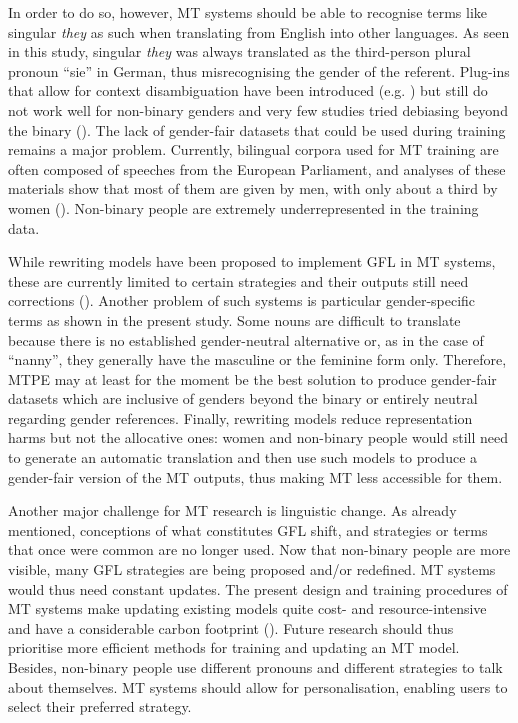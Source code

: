 In order to do so, however, MT systems should be able to recognise terms like singular \textit{they} as such when translating from English into other languages. As seen in this study, singular \textit{they} was always translated as the third-person plural pronoun ``sie'' in German, thus misrecognising the gender of the referent. Plug-ins that allow for context disambiguation have been introduced (e.g. \cite{mechura-2022-taxonomy}) but still do not work well for non-binary genders and very few studies tried debiasing beyond the binary (\cite{saunders2020neural}). The lack of gender-fair datasets that could be used during training remains a major problem. Currently, bilingual corpora used for MT training are often composed of speeches from the European Parliament, and analyses of these materials show that most of them are given by men, with only about a third by women (\cite{vanmassenhove2019getting}). Non-binary people are extremely underrepresented in the training data.

While rewriting models have been proposed to implement GFL in MT systems, these are currently limited to certain strategies and their outputs still need corrections (\cite{amrhein-etal-2023-exploiting}). Another problem of such systems is particular gender-specific terms as shown in the present study. Some nouns are difficult to translate because there is no established gender-neutral alternative or, as in the case of ``nanny'', they generally have the masculine or the feminine form only. Therefore, MTPE may at least for the moment be the best solution to produce gender-fair datasets which are inclusive of genders beyond the binary or entirely neutral regarding gender references. Finally, rewriting models reduce representation harms but not the allocative ones: women and non-binary people would still need to generate an automatic translation and then use such models to produce a gender-fair version of the MT outputs, thus making MT less accessible for them. 

Another major challenge for MT research is linguistic change. As already mentioned, conceptions of what constitutes GFL shift, and strategies or terms that once were common are no longer used. Now that non-binary people are more visible, many GFL strategies are being proposed and/or redefined. MT systems would thus need constant updates. The present design and training procedures of MT systems make updating existing models quite cost- and resource-intensive and have a considerable carbon footprint (\cite{shterionov2023ecological}). Future research should thus prioritise more efficient methods for training and updating an MT model. Besides, non-binary people use different pronouns and different strategies to talk about themselves. MT systems should allow for personalisation, enabling users to select their preferred strategy.


